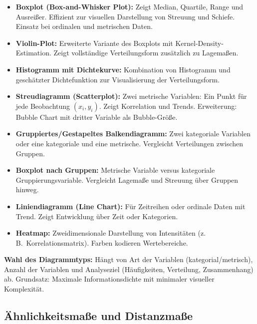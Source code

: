 \begin{itemize}[leftmargin=1.5em]
    \item \textbf{Boxplot (Box-and-Whisker Plot):} Zeigt Median, Quartile, Range und Ausreißer. Effizient zur visuellen Darstellung von Streuung und Schiefe. Einsatz bei ordinalen und metrischen Daten.
    \item \textbf{Violin-Plot:} Erweiterte Variante des Boxplots mit Kernel-Density-Estimation. Zeigt vollständige Verteilungsform zusätzlich zu Lagemaßen.
    \item \textbf{Histogramm mit Dichtekurve:} Kombination von Histogramm und geschätzter Dichtefunktion zur Visualisierung der Verteilungsform.
\end{itemize}

\begin{itemize}[leftmargin=1.5em]
    \item \textbf{Streudiagramm (Scatterplot):} Zwei metrische Variablen: Ein Punkt für jede Beobachtung $(x_i, y_i)$. Zeigt Korrelation und Trends. Erweiterung: Bubble Chart mit dritter Variable als Bubble-Größe.
    \item \textbf{Gruppiertes/Gestapeltes Balkendiagramm:} Zwei kategoriale Variablen oder eine kategoriale und eine metrische. Vergleicht Verteilungen zwischen Gruppen.
    \item \textbf{Boxplot nach Gruppen:} Metrische Variable versus kategoriale Gruppierungsvariable. Vergleicht Lagemaße und Streuung über Gruppen hinweg.
    \item \textbf{Liniendiagramm (Line Chart):} Für Zeitreihen oder ordinale Daten mit Trend. Zeigt Entwicklung über Zeit oder Kategorien.
    \item \textbf{Heatmap:} Zweidimensionale Darstellung von Intensitäten (z.\,B.\ Korrelationsmatrix). Farben kodieren Wertebereiche.
\end{itemize}

\textbf{Wahl des Diagrammtyps:} Hängt von Art der Variablen (kategorial/metrisch), Anzahl der Variablen und Analyseziel (Häufigkeiten, Verteilung, Zusammenhang) ab. Grundsatz: Maximale Informationsdichte mit minimaler visueller Komplexität.

\newpage

\subsection{Ähnlichkeitsmaße und Distanzmaße}

